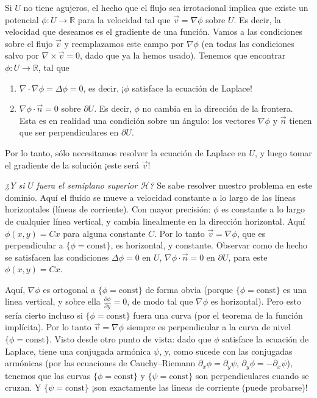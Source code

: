 \documentclass{article}
\newcommand{\realNumbers}{\mathbb{R}}
\newcommand{\upperHalfPlane}{\mathcal{H}}
\theoremstyle{remark}
\begin{document}
  Si \(U\) no tiene agujeros, el hecho que el flujo sea irrotacional implica que existe un potencial \(\phi : U \rightarrow \realNumbers\) para la velocidad tal que \(\vec{v} = \nabla \phi\) sobre \(U\).
  Es decir, la velocidad que deseamos es el gradiente de una función.
  Vamos a las condiciones sobre el flujo \(\vec{v}\) y reemplazamos este campo por \(\nabla \phi\) (en todas las condiciones salvo por \(\nabla \times \vec{v} = 0\), dado que ya la hemos usado).
  Tenemos que encontrar \(\phi : U \rightarrow \realNumbers\), tal que
  \begin{enumerate}
    \item \(\nabla \cdot \nabla \phi = \Delta \phi = 0\), es decir, ¡\(\phi\) satisface la ecuación de Laplace!
    \item \(\nabla \phi \cdot \vec{n} = 0\) sobre \(\partial U\).
    Es decir, \(\phi\) no cambia en la dirección de la frontera.
    Esta es en realidad una condición sobre un ángulo: los vectores \(\nabla \phi\) y \(\vec{n}\) tienen que ser perpendiculares en \(\partial U\).
  \end{enumerate}
  Por lo tanto, sólo necesitamos resolver la ecuación de Laplace en \(U\), y luego tomar el gradiente de la solución
  ¡este será \(\vec{v}\)!

  \emph{¿Y si} \(U\) \emph{fuera el semiplano superior \(\upperHalfPlane\)?}
  Se sabe resolver nuestro problema en este dominio.
  Aquí el fluído se mueve a velocidad constante a lo largo de las líneas horizontales (líneas de corriente).
  Con mayor precisión:
  \(\phi\) es constante a lo largo de cualquier línea vertical, y cambia linealmente en la dirección horizontal.
  Aquí \(\phi(x, y) = C x\) para alguna constante \(C\).
  Por lo tanto \(\vec{v} = \nabla \phi\), que es perpendicular a \(\{\phi = \text{const}\}\), es horizontal, y constante.
  Observar como de hecho se satisfacen las condiciones \(\Delta \phi = 0\) en \(U\), \(\nabla \phi \cdot \vec{n} = 0\) en \(\partial U\), para este \(\phi(x, y) = C x\).

  Aquí, \(\nabla \phi\) es ortogonal a \(\{\phi = \text{const}\}\) de forma obvia
  (porque \(\{\phi = \text{const}\}\) es una linea vertical, y sobre ella \(\frac{\partial \phi}{\partial y} = 0\), de modo tal que \(\nabla \phi\) es horizontal).
  Pero esto sería cierto incluso si \(\{\phi = \text{const}\}\) fuera una curva (por el teorema de la función implícita).
  Por lo tanto \(\vec{v} = \nabla \phi\) siempre es perpendicular a la curva de nivel \(\{\phi = \text{const}\}\).
  Visto desde otro punto de vista: dado que \(\phi\) satisface la ecuación de Laplace, tiene una conjugada armónica \(\psi\), y, como sucede con las conjugadas armónicas (por las ecuaciones de Cauchy--Riemann \(\partial_x \phi = \partial_y \psi\), \(\partial_y \phi = - \partial_x \psi\)), tenemos que las curvas \(\{\phi = \text{const}\}\) y \(\{\psi = \text{const}\}\) son perpendiculares cuando se cruzan.
  Y \(\{\psi = \text{const}\}\) ¡son exactamente las lineas de corriente (puede probarse)!
\end{document}
